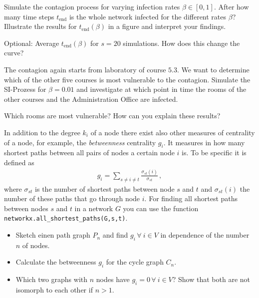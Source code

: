 Simulate the contagion process for varying infection rates $\beta \in [0,1]$. After how many time steps $t_{\mathrm{end}}$ is the whole network infected for the different rates $\beta$? Illustrate the results for $t_{\mathrm{end}}(\beta)$ in a figure and interpret your findings.

Optional:  Average $t_{\mathrm{end}}(\beta)$ for $s=20$ simulations. How does this change the curve?

\subexercise[%
  topic= Vulnerable Courses,
    ]

The contagion again starts from laboratory of course $5.3$. We want to determine which of the other five courses is most vulnerable to the contagion. Simulate the SI-Prozess for $\beta=0.01$ and investigate at which point in time the rooms of the other courses and the Administration Office are infected. 

Which rooms are most vulnerable? How can you explain these results?


\exercise[%
  topic =  \emph{Betweenness} Centrality
      ]


In addition to the degree $k_i$ of a node there exist also other measures of centrality of a node, for example, the \emph{betweenness} centrality $g_i$. It measures in how many shortest paths between all pairs of nodes a certain node $i$ is. To be specific it is defined as 
\begin{align}
g_i = \sum_{s\neq i\neq t} \frac{\sigma_{st}(i)}{\sigma_{st}}\,,
\end{align}
where $\sigma_{st}$ is the number of shortest paths between node $s$ and $t$ and  $\sigma_{st}(i)$ the number of these paths that go through node $i$. For finding all shortest paths between nodes $s$ and $t$ in a network $G$ you can use the function  \texttt{networkx.all\_shortest\_paths(G,s,t)}.

\subexercise[%
  topic= Betweenness Centrality of Graph Models,
    ]

\begin{itemize}
\item Sketch einen path graph $P_n$ and find $g_i\,\forall\ i \in V$ in dependence of the number $n$ of nodes.
\item Calculate the betweenness $g_i$ for the cycle graph $C_n$.
\item Which two graphs with $n$ nodes have $g_i=0\,\forall\ i \in V$? Show that both are not isomorph to each other if $n>1$.
\end{itemize}


\subexercise[%
  topic= Betweenness Centrality of a Complete Graph after Deletion of an Edge,
    ]

